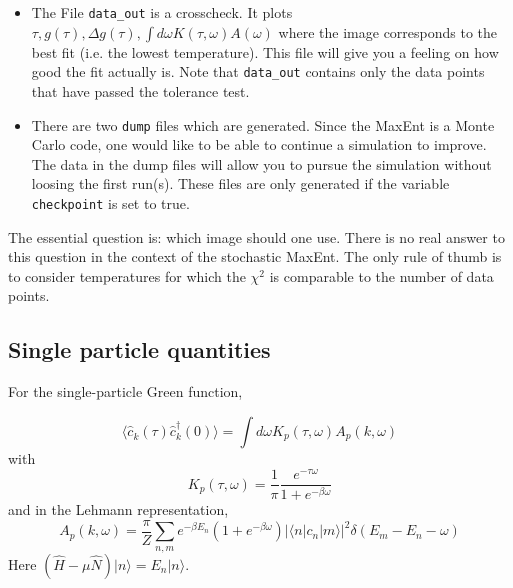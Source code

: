 \begin{itemize}
\item  The File \texttt{data\_out}  is a crosscheck. It plots   $ \tau,  g(\tau),  \Delta g(\tau), \int d \omega  K(\tau, \omega) A(\omega) $ where the image  corresponds to the best fit (i.e. the lowest temperature). 
This file will give you  a feeling on how good the fit actually is.  Note that  \texttt{data\_out} contains only the data points that have  passed the tolerance test. 


\item There are two \texttt{dump} files which are generated. Since  the MaxEnt is a  Monte Carlo code, one  would like to be able to continue a simulation to improve. The data in the dump files will allow you to pursue the simulation without loosing the first run(s).   These files are  only generated if the variable  \texttt{checkpoint} is set to true. 
 \end{itemize}

The essential question is: which image should one use. There is no real answer to this question in the context of the stochastic MaxEnt. The only rule of thumb is to consider temperatures for which the \( \chi^2 \) is  comparable to the number of data points.


\subsection{Single particle quantities}
For the single-particle Green function, 

\begin{equation} 
	\langle \hat{c}^{\phantom\dagger}_{k} (\tau)  \hat{c}^{\dagger}_{k} (0)   \rangle   = \int d \omega  K_p(\tau,\omega)   A_p(k, \omega) 
\end{equation}
with 
\begin{equation}
K_{p}(\tau,\omega) =    \frac{1}{\pi} \frac{e^{-\tau \omega} }  {  1 + e^{-\beta\omega} }
\end{equation}
and in the Lehmann representation, 
 \begin{equation}
   A_p(k, \omega) = \frac{ \pi}{Z} \sum_{n,m} e^{-\beta E_n } \left( 1 + e^{-\beta \omega}\right) | \langle n | c_n | m  \rangle |^{2} \delta \left( E_m - E_n - \omega \right)  
\end{equation}  
Here $ \left( \hat{H} - \mu \hat{N} \right) | n \rangle = E_n | n \rangle  $.

